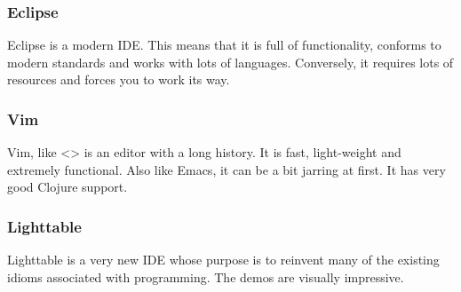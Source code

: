 \subsubsection{Eclipse}
\label{sec-6-1-2}

Eclipse is a modern IDE. This means that it is full of functionality,
conforms to modern standards and works with lots of languages.
Conversely, it requires lots of resources and forces you to work its
way.

\subsubsection{Vim}
\label{sec-6-1-3}

Vim, like <> is an editor with a long history. It is fast, light-weight
and extremely functional. Also like Emacs, it can be a bit jarring at
first. It has very good Clojure support.

\subsubsection{Lighttable}
\label{sec-6-1-4}

Lighttable is a very new IDE whose purpose is to reinvent many of the
existing idioms associated with programming. The demos are visually
impressive.


